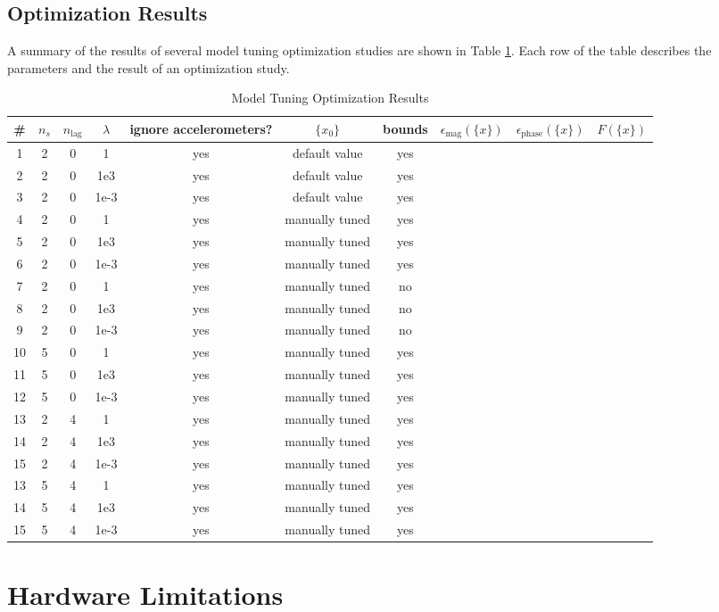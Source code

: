 \subsection{Optimization Results}

A summary of the results of several model tuning optimization studies are shown in Table \ref{tab:optResult}. Each row of the table describes the parameters and the result of an optimization study.

\begin{landscape}
\begin{table}[H]
	\centering
	\label{tab:optResult}
	\caption{Model Tuning Optimization Results}
	\begin{tabular}{cccccccccc}
		\hline\hline
		\# & $n_s$ & $n_\text{lag}$ & $\lambda$ & ignore accelerometers? & $\{x_0\}$ & bounds & $\epsilon_\text{mag}(\{x\})$ & $\epsilon_\text{phase}(\{x\})$ & $F(\{x\})$ \\
		\hline
		1 & 2 & 0 & 1 & yes & default value & yes &  &  &  \\
		2 & 2 & 0 & 1e3 & yes & default value & yes &  &  &  \\
		3 & 2 & 0 & 1e-3 & yes & default value & yes &  &  &  \\
		4 & 2 & 0 & 1 & yes & manually tuned & yes &  &  &  \\
		5 & 2 & 0 & 1e3 & yes & manually tuned & yes &  &  &  \\
		6 & 2 & 0 & 1e-3 & yes & manually tuned & yes &  &  &  \\
		7 & 2 & 0 & 1 & yes & manually tuned & no &  &  &  \\
		8 & 2 & 0 & 1e3 & yes & manually tuned & no &  &  &  \\
		9 & 2 & 0 & 1e-3 & yes & manually tuned & no &  &  &  \\
		10 & 5 & 0 & 1 & yes & manually tuned & yes &  &  &  \\
		11 & 5 & 0 & 1e3 & yes & manually tuned & yes &  &  &  \\
		12 & 5 & 0 & 1e-3 & yes & manually tuned & yes &  &  &  \\
		13 & 2 & 4 & 1 & yes & manually tuned & yes &  &  &  \\
		14 & 2 & 4 & 1e3 & yes & manually tuned & yes &  &  &  \\
		15 & 2 & 4 & 1e-3 & yes & manually tuned & yes &  &  &  \\
		13 & 5 & 4 & 1 & yes & manually tuned & yes &  &  &  \\
		14 & 5 & 4 & 1e3 & yes & manually tuned & yes &  &  &  \\
		15 & 5 & 4 & 1e-3 & yes & manually tuned & yes &  &  &  \\
		\hline\hline
	\end{tabular}
\end{table}
\end{landscape}



\section{Hardware Limitations} %
\label{sec:shortcomings}

